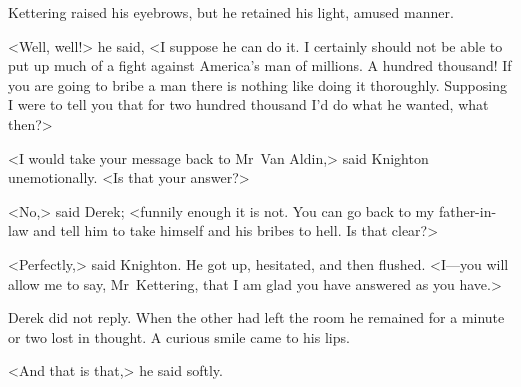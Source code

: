 Kettering raised his eyebrows, but he retained his light, amused manner.

<Well, well!> he said, <I suppose he can do it. I certainly should not be able to put up much of a fight against America's man of millions. A hundred thousand! If you are going to bribe a man there is nothing like doing it thoroughly. Supposing I were to tell you that for two hundred thousand I'd do what he wanted, what then?>

<I would take your message back to Mr~Van Aldin,> said Knighton unemotionally. <Is that your answer?>

<No,> said Derek; <funnily enough it is not. You can go back to my father-in-law and tell him to take himself and his bribes to hell. Is that clear?>

<Perfectly,> said Knighton. He got up, hesitated, and then flushed. <I—you will allow me to say, Mr~Kettering, that I am glad you have answered as you have.>

Derek did not reply. When the other had left the room he remained for a minute or two lost in thought. A curious smile came to his lips.

<And that is that,> he said softly.